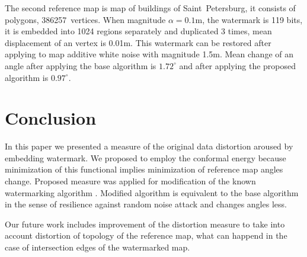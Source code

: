 \documentclass{article}
\begin{document}
The second reference map is map of buildings of Saint~Petersburg, it consists of polygons, 386257~vertices. When magnitude $\alpha = 0.1$m, the watermark is 119 bits, it is embedded into 1024 regions separately 
and duplicated 3 times, mean displacement of an vertex is 0.01m. This watermark can be restored after applying to map additive white noise with magnitude 1.5m. 
Mean change of an angle after applying the base algorithm is $1.72^\circ$ and after applying the proposed algorithm is $0.97^\circ$.  

\section{Conclusion}
\label{sec:conclusion}
In this paper we presented a measure of the original data distortion aroused by embedding watermark. We proposed to employ the conformal energy because minimization of this functional implies 
minimization of reference map angles change. Proposed measure was applied for modification of the known watermarking algorithm \cite{Ohbuchi}. Modified algorithm is equivalent to the base algorithm in the sense of 
resilience against random noise attack and changes angles less.

Our future work includes improvement of the distortion measure to take into account distortion of topology of the reference map, what can happend in the case of intersection edges of the watermarked map.



\end{document}
